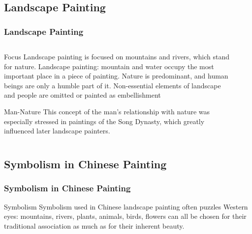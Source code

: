 \documentclass[pdflatex,compress,8pt,
	xcolor={dvipsnames,dvipsnames,svgnames,x11names,table},
	hyperref={	
	breaklinks = true, 
	pdfauthor={Lemenkova Polina}, 
	pdfsubject={Preentation}, 
	pdfcreator={Lemenkova Polina}, 
	pdfproducer={Lemenkova Polina}, 
	colorlinks=true,
	linkcolor=NavyBlue, 
	citecolor=NavyBlue, 
	urlcolor = NavyBlue, 
	breaklinks = true}]{beamer}
\begin{document}
\subsection{Landscape Painting}
\begin{frame}\frametitle{Landscape Painting}

\begin{minipage}[0.4\textheight]{\textwidth}
		\begin{columns}[T]
			\begin{column}{0.4\textwidth}
	\begin{alertblock}{Focus}
	Landscape painting is focused on mountains and rivers, which stand for nature. Landscape painting: mountain and water occupy the most important place in a piece of painting. Nature is predominant, and human beings are only a humble part of it. Non-essential elements of landscape and people are omitted or painted as embellishment
	\end{alertblock}

	\begin{alertblock}{Man-Nature}
	This concept of the man’s relationship with nature was especially stressed in paintings of the Song Dynasty, which greatly influenced later landscape painters.
	\end{alertblock}
			\end{column}
			\begin{column}{0.6\textwidth}
			\begin{figure}[H]
				\centering
						\vspace{1mm}
			\end{figure}
			\end{column}
		\end{columns}
	\end{minipage}



	
\end{frame}

\subsection{Symbolism in Chinese Painting}
\begin{frame}\frametitle{Symbolism in Chinese Painting}

	\begin{alertblock}{Symbolism}
	Symbolism used in Chinese landscape painting often puzzles Western eyes: mountains, rivers, plants, animals, birds, flowers can all be chosen for their traditional association as much as for their inherent beauty.
	\end{alertblock}
	
\begin{figure}[H]
	\centering
			\hspace{1mm}
\end{figure}
	
\end{frame}
\end{document}
